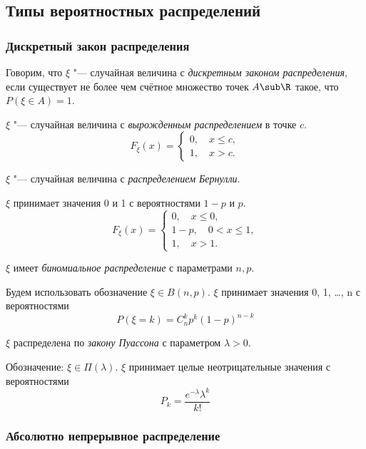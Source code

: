\subsection{Типы вероятностных распределений}

\subsubsection{Дискретный закон распределения}

\begin{definition}
	Говорим, что $ \xi $ "--- случайная величина с \emph{дискретным законом распределения}, если
	существует не более чем счётное множество точек $ A \sub \R $ такое, что $ P(\xi \in A) = 1 $.
\end{definition}

\begin{exmpls}
\item $ \xi $ "--- случайная величина с \emph{вырожденным распределением} в точке $ c $.
	$$ F_\xi(x) =
	\begin{cases}
		0, \quad x \le c, \\
		1, \quad x > c.
	\end{cases} $$
\item $ \xi $ "--- случайная величина с \emph{распределением Бернулли}.

	$ \xi $ принимает значения 0 и 1 с вероятностями $ 1 - p $ и $ p $.
	$$ F_\xi(x) =
	\begin{cases}
		0, \quad x \le 0, \\
		1 - p, \quad 0 < x \le 1, \\
		1, \quad x > 1.
	\end{cases} $$
\item $ \xi $ имеет \emph{биномиальное распределение} с параметрами $ n, p $.

	Будем использовать обозначение $ \xi \in B(n, p) $.
	$ \xi $ принимает значения 0, 1, \dots, n с вероятностями
	$$ P(\xi = k) = C_n^k p^k (1 - p)^{n - k} $$
\item $ \xi $ распределена по \emph{закону Пуассона} с параметром $ \lambda > 0 $.

	Обозначение: $ \xi \in \Pi(\lambda) $.
	$ \xi $ принимает целые неотрицательные значения с вероятностями
	$$ P_k = \frac{e^{-\lambda}\lambda^k}{k!} $$
\end{exmpls}

\subsubsection{Абсолютно непрерывное распределение}

